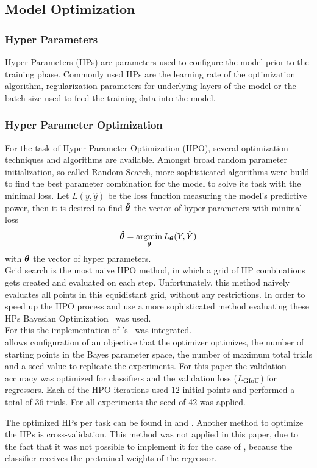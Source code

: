 \subsection{Model Optimization}\label{subsec:model-optimization}
\subsubsection{Hyper Parameters}\label{subsubsec:hyperparameters}
Hyper Parameters (HPs) are parameters used to configure the model prior to the training phase.
Commonly used HPs are the learning rate of the optimization algorithm, regularization parameters for underlying layers of the model or the batch size used to feed the training data into the model.


\subsubsection{Hyper Parameter Optimization}\label{subsubsec:hpo}
For the task of Hyper Parameter Optimization (HPO), several optimization techniques and algorithms are available.
Amongst broad random parameter initialization, so called Random Search, more sophisticated algorithms were build to find the best parameter combination for the model to solve its task with the minimal loss.
Let $L(y,\hat{y})$ be the loss function measuring the model's predictive power, then it is desired to find $\bm{\hat{\theta}}$ the vector of hyper parameters with minimal loss
\begin{align}
    \bm{\hat{\theta}} = \operatorname*{argmin}_{\bm{\theta}} L_{\bm{\theta}}(Y, \hat{Y})
\end{align}
with $\bm{\theta}$ the vector of hyper parameters.\\
Grid search is the most naive HPO method, in which a grid of HP combinations gets created and evaluated on each step.
Unfortunately, this method naively evaluates  all points in this equidistant grid, without any restrictions.
In order to speed up the HPO process and use a more sophisticated method evaluating these HPs Bayesian Optimization~\cite{BayesianOptimization} was used.\\
For this the implementation of 's~\cite{omalley2019kerastuner}  was integrated.\\
 allows configuration of an objective  that the optimizer optimizes,  the number of starting points in the Bayes parameter space,  the number of maximum total trials and  a seed value to replicate the experiments.
For this paper the validation accuracy was optimized for classifiers and the validation loss ($L_{\text{GIoU}}$) for regressors.
Each of the HPO iterations used $12$ initial points and performed a total of $36$ trials.
For all experiments the seed of $42$ was applied.

The optimized HPs per task can be found in  and .
Another method to optimize the HPs is cross-validation. This method was not applied in this paper, due to the fact that it was not possible to implement it for the case of , because the classifier receives the pretrained weights of the regressor.
